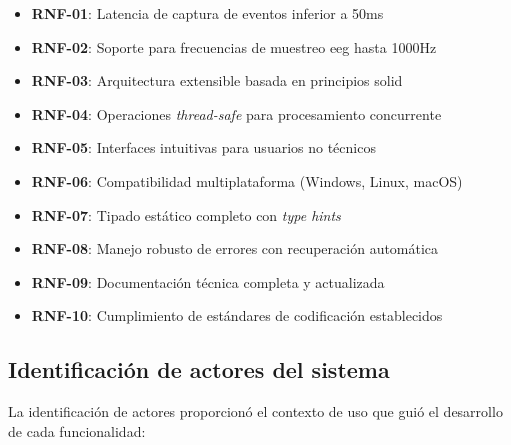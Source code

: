 \begin{itemize}
    \item \textbf{RNF-01}: Latencia de captura de eventos inferior a 50ms
    \item \textbf{RNF-02}: Soporte para frecuencias de muestreo \acrshort{eeg} hasta 1000Hz
    \item \textbf{RNF-03}: Arquitectura extensible basada en principios \acrshort{solid}
    \item \textbf{RNF-04}: Operaciones \textit{\gls{thread-safe}} para procesamiento concurrente
    \item \textbf{RNF-05}: Interfaces intuitivas para usuarios no técnicos
    \item \textbf{RNF-06}: Compatibilidad multiplataforma (Windows, Linux, macOS)
    \item \textbf{RNF-07}: Tipado estático completo con \textit{\gls{type hints}}
    \item \textbf{RNF-08}: Manejo robusto de errores con recuperación automática
    \item \textbf{RNF-09}: Documentación técnica completa y actualizada
    \item \textbf{RNF-10}: Cumplimiento de estándares de codificación establecidos
\end{itemize}

\subsection{Identificación de actores del sistema}
\label{subsec:actores_sistema}

La identificación de actores proporcionó el contexto de uso que guió el desarrollo de cada funcionalidad:

